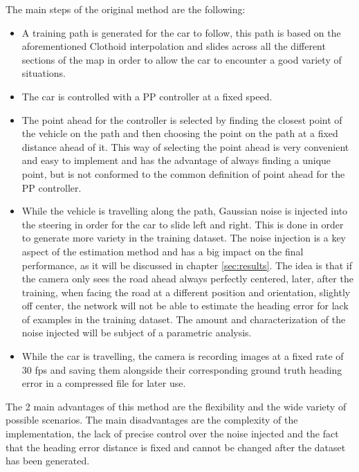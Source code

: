 \documentclass[a4paper,12pt,sort&compress]{article}
\begin{document}
The main steps of the original method are the following:
\begin{itemize}
    \item A training path is generated for the car to follow, this path is based on the
    aforementioned Clothoid interpolation and slides across all the different sections of the map in
    order to allow the car to encounter a good variety of situations.
    \item The car is controlled with a PP controller at a fixed speed. 
    \item The point ahead for the controller is selected by finding the closest point of the vehicle
    on the path and then choosing the point on the path at a fixed distance ahead of it. This way of
    selecting the point ahead is very convenient and easy to implement and has the advantage of
    always finding a unique point, but is not conformed to the common definition of point ahead for
    the PP controller. 
    \item While the vehicle is travelling along the path, Gaussian noise is injected into the
    steering in order for the car to slide left and right. This is done in order to generate more
    variety in the training dataset. The noise injection is a key aspect of the estimation method
    and has a big impact on the final performance, as it will be discussed in chapter
    \ref*{sec:results}. The idea is that if the camera only sees the road ahead always perfectly
    centered, later, after the training, when facing the road at a different position and
    orientation, slightly off center, the network will not be able to estimate the heading error for
    lack of examples in the training dataset. The amount and characterization of the noise injected
    will be subject of a parametric analysis.
    \item While the car is travelling, the camera is recording images at a fixed rate of 30 fps and
    saving them alongside their corresponding ground truth heading error in a compressed file for
    later use. 
\end{itemize}
The 2 main advantages of this method are the flexibility and the wide variety of possible scenarios.
The main disadvantages are the complexity of the implementation, the lack of precise control over
the noise injected and the fact that the heading error distance is fixed and cannot be changed after
the dataset has been generated.
\end{document}
